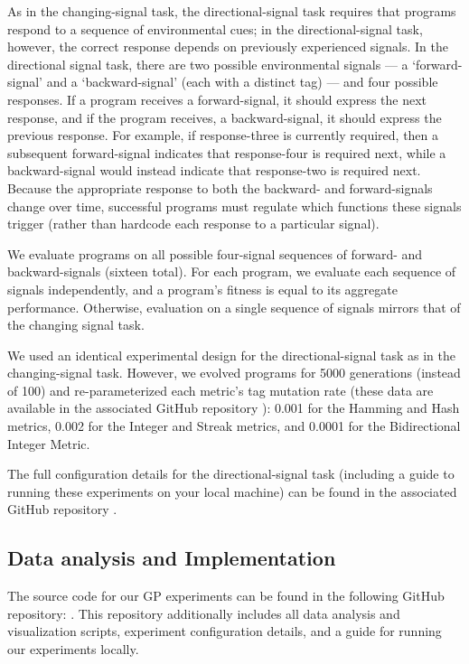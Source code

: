 As in the changing-signal task, the directional-signal task requires that programs respond to a sequence of environmental cues; in the directional-signal task, however, the correct response depends on previously experienced signals.
In the directional signal task, there are two possible environmental signals --- a `forward-signal' and a `backward-signal' (each with a distinct tag) ---  and four possible responses.
If a program receives a forward-signal, it should express the next response, and if the program receives, a backward-signal, it should express the previous response.
For example, if response-three is currently required, then a subsequent forward-signal indicates that response-four is required next, while a backward-signal would instead indicate that response-two is required next.
Because the appropriate response to both the backward- and forward-signals change over time, successful programs must regulate which functions these signals trigger (rather than hardcode each response to a particular signal).

We evaluate programs on all possible four-signal sequences of forward- and backward-signals (sixteen total).
For each program, we evaluate each sequence of signals independently, and a program's fitness is equal to its aggregate performance.
Otherwise, evaluation on a single sequence of signals mirrors that of the changing signal task.

We used an identical experimental design for the directional-signal task as in the changing-signal task.
However, we evolved programs for 5000 generations (instead of 100) and re-parameterized each metric's tag mutation rate (these data are available in the associated GitHub repository ):
0.001 for the Hamming and Hash metrics, 0.002 for the Integer and Streak metrics, and 0.0001 for the Bidirectional Integer Metric.

The full configuration details for the directional-signal task (including a guide to running these experiments on your local machine) can be found in the associated GitHub repository .

\subsection{Data analysis and Implementation}

The source code for our GP experiments can be found in the following GitHub repository: . This repository additionally includes all data analysis and visualization scripts, experiment configuration details, and a guide for running our experiments locally.
